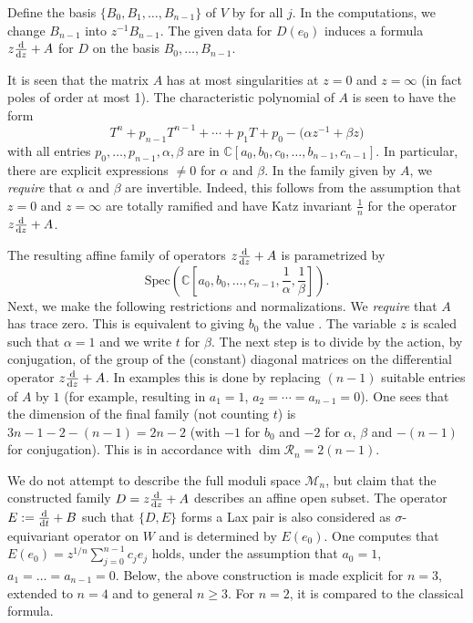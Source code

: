 \documentclass[pdftex]{sigma}
\numberwithin{equation}{section}
\begin{document}
Define the basis $\{B_0,B_1,\dots ,B_{n-1}\}$ of $V$ by  for all $j$.
In the computations, we change $B_{n-1}$
into $z^{-1}B_{n-1}$. The given data for $D(e_0)$ induces a formula $z\frac{{\rm d}}{{\rm d}z}+A$ for $D$ on the basis $B_0,\dots ,B_{n-1}$.

 It is seen that the matrix $A$ has at most singularities at $z=0$ and $z=\infty$ (in fact poles of order at most 1). The characteristic polynomial of $A$ is seen to have the form
 \[
 T^n+p_{n-1}T^{n-1}+\cdots +p_1T+p_0-\bigl(\alpha z^{-1}+\beta z\bigr)
 \]
 with all entries $p_0,\dots ,p_{n-1},\alpha , \beta$ are in $\mathbb{C}[a_0,b_0,c_0,\dots ,b_{n-1},c_{n-1}]$.
 In particular, there are explicit expressions $\neq 0$ for $\alpha$ and $\beta$. In the family given by $A$, we {\it require} that $\alpha$ and $\beta$
 are invertible. Indeed, this follows from the assumption that $z=0$ and $z=\infty$ are totally ramified and have Katz invariant
 $\frac{1}{n}$ for the operator $z\frac{{\rm d}}{{\rm d}z}+A$.



 The resulting affine family of operators $z\frac{{\rm d}}{{\rm d}z}+A$ is parametrized by
 \[
 \textrm{Spec}\left(\mathbb{C}\left[a_0,b_0,\dots ,c_{n-1},\frac{1}{\alpha}, \frac{1}{\beta}\right]\right).
 \]
 Next, we make the following
restrictions and normalizations. We {\it require} that $A$ has trace zero. This is equivalent to giving
$b_0$ the value . The variable $z$ is scaled such that $\alpha=1$ and we write $t$ for $\beta$.
The next step is to divide by the action, by conjugation, of the group of the (constant) diagonal matrices on the differential operator $z\frac{{\rm d}}{{\rm d}z}+A$. In examples this is done by replacing $(n-1)$ suitable entries of $A$ by $1$ (for example, resulting in $a_1=1$, $a_2=\cdots =a_{n-1}=0$). One sees that the dimension of the final family (not counting $t$) is $3n-1-2-(n-1)=2n-2$ (with $-1$ for $b_0$ and $-2$ for $\alpha$, $\beta$ and $-(n-1)$ for conjugation).
This is in accordance with $\dim \mathcal{R}_n=2(n-1)$.



We do not attempt to describe the full moduli space $\mathcal{M}_n$, but claim that the constructed family
$D=z\frac{{\rm d}}{{\rm d}z}+A$ describes an affine open subset. The operator $E:=\frac{{\rm d}}{{\rm d}t}+B$ such that $\{D,E\}$ forms
a Lax pair is also considered as $\sigma$-equivariant operator on $W$ and is determined by $E(e_0)$. One computes that
$E(e_0)=z^{1/n}\sum _{j=0}^{n-1}c_je_j$ holds, under the assumption that $a_0=1$, $a_1=\dots =a_{n-1}=0$.
Below, the above construction is made explicit for $n=3$, extended to $n=4$ and to general $n\geq 3$. For $n=2$, it is compared
to the classical formula.
\end{document}
